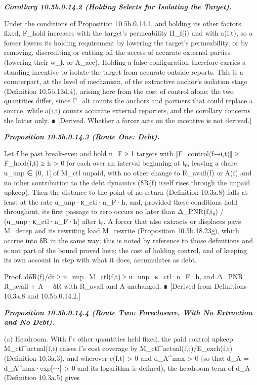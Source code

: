 \documentclass[
]{article}
\begin{document}
\emph{\textbf{Corollary 10.5b.0.14.2 (Holding Selects for Isolating the
Target).}}

Under the conditions of Proposition 10.5b.0.14.1, and holding its other
factors fixed, F\_hold increases with the target's permeability Π\_f(i)
and with a(i,t), so a forcer lowers its holding requirement by lowering
the target's permeability, or by removing, discrediting or cutting off
the access of accurate external parties (lowering their w\_k or A\_acc).
Holding a false configuration therefore carries a standing incentive to
isolate the target from accurate outside reports. This is a counterpart,
at the level of mechanism, of the extractive anchor's isolation stage
(Definition 10.5b.13d.4), arising here from the cost of control alone;
the two quantities differ, since Γ\_alt counts the anchors and partners
that could replace a source, while a(i,t) counts accurate external
reporters, and the corollary concerns the latter only. ∎ {[}Derived.
Whether a forcer acts on the incentive is not derived.{]}

\emph{\textbf{Proposition 10.5b.0.14.3 (Route One: Debt).}}

Let f be past break-even and hold n\_F ≥ 1 targets with
‖F\_control(f→i,t)‖ ≥ F\_hold(i,t) ≥ h \textgreater{} 0 for each over an
interval beginning at t₀, leaving a share u\_unp ∈ (0, 1{]} of M\_ctl
unpaid, with no other change to R\_avail(f) or A(f) and no other
contribution to the debt dynamics (δR(f) itself rises through the unpaid
upkeep). Then the distance to the point of no return (Definition
10.3a.8) falls at least at the rate u\_unp·κ\_ctl·n\_F·h, and, provided
these conditions hold throughout, its first passage to zero occurs no
later than Δ\_PNR(f,t₀) / (u\_unp·κ\_ctl·n\_F·h) after t₀. A forcer that
also extracts or displaces pays M\_decep and its rewriting load
M\_rewrite (Proposition 10.5b.18.23g), which accrue into δR in the same
way; this is noted by reference to those definitions and is not part of
the bound proved here: the cost of holding control, and of keeping its
own account in step with what it does, accumulates as debt.

Proof. dδR(f)/dt ≥ u\_unp·M\_ctl(f,t) ≥ u\_unp·κ\_ctl·n\_F·h, and Δ\_PNR
= R\_avail + A − δR with R\_avail and A unchanged. ∎ {[}Derived from
Definitions 10.3a.8 and 10.5b.0.14.2.{]}

\emph{\textbf{Proposition 10.5b.0.14.4 (Route Two: Foreclosure, With No
Extraction and No Debt).}}

(a) Headroom. With f's other quantities held fixed, the paid control
upkeep M\_ctl\^{}actual(f,t) raises f's cost coverage by
M\_ctl\^{}actual(f,t)/E\_exch(f,t) (Definition 10.3a.3), and wherever
c(f,t) \textgreater{} 0 and d\_A\^{}max \textgreater{} 0 (so that d\_A =
d\_A\^{}max·exp{[}⋯{]} \textgreater{} 0 and its logarithm is defined),
the headroom term of d\_A (Definition 10.3a.5) gives
\end{document}
